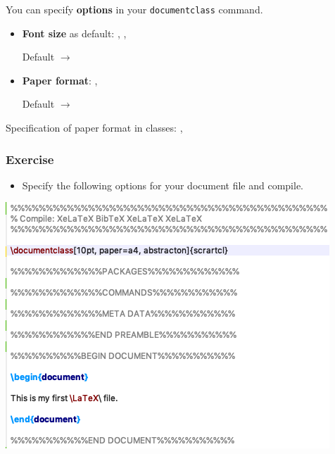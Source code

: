 \begin{frame}[fragile]

You can specify \textbf{options} in your \lstinline|documentclass| command.

\begin{itemize}
	\item \textbf{Font size} as default: \ltxterm{10pt}, \ltxterm{11pt}, \ltxterm{12pt} \par
	Default $\rightarrow$ \ltxterm{10pt} 
	
	\item \textbf{Paper format}: ,  \par
	Default $\rightarrow$ 

\end{itemize}

Specification of paper format in  classes: ,  

\end{frame}


\begin{frame}[fragile]
\frametitle{Exercise}

\begin{itemize}
	\item Specify the following options for your document   file and compile.
\end{itemize}

\vspace{.25cm}

\centering
\includegraphics[scale=0.45]{../../texfiles-beamer/tex-material/WissArb-latex/xelatexTest2tex}

\end{frame}


